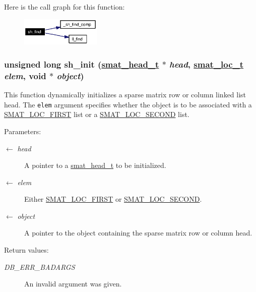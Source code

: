Here is the call graph for this function:\begin{figure}[H]
\begin{center}
\leavevmode
\includegraphics[width=108pt]{group__dbprim__smat_ga22_cgraph}
\end{center}
\end{figure}
\hypertarget{group__dbprim__smat_ga20}{
\subsubsection[sh\_\-init]{\setlength{\rightskip}{0pt plus 5cm}unsigned long sh\_\-init (\hyperlink{struct__smat__head__s}{smat\_\-head\_\-t} $\ast$ {\em head}, \hyperlink{group__dbprim__smat_ga6}{smat\_\-loc\_\-t} {\em elem}, void $\ast$ {\em object})}}
\label{group__dbprim__smat_ga20}


This function dynamically initializes a sparse matrix row or column linked list head. The {\tt elem} argument specifies whether the object is to be associated with a \hyperlink{group__dbprim__smat_gga70a137}{SMAT\_\-LOC\_\-FIRST} list or a \hyperlink{group__dbprim__smat_gga70a138}{SMAT\_\-LOC\_\-SECOND} list.

\begin{Desc}
\item[Parameters:]
\begin{description}
\item[\mbox{$\leftarrow$} {\em head}]A pointer to a \hyperlink{group__dbprim__smat_ga1}{smat\_\-head\_\-t} to be initialized. \item[\mbox{$\leftarrow$} {\em elem}]Either \hyperlink{group__dbprim__smat_gga70a137}{SMAT\_\-LOC\_\-FIRST} or \hyperlink{group__dbprim__smat_gga70a138}{SMAT\_\-LOC\_\-SECOND}. \item[\mbox{$\leftarrow$} {\em object}]A pointer to the object containing the sparse matrix row or column head.\end{description}
\end{Desc}
\begin{Desc}
\item[Return values:]
\begin{description}
\item[{\em DB\_\-ERR\_\-BADARGS}]An invalid argument was given.\end{description}
\end{Desc}


